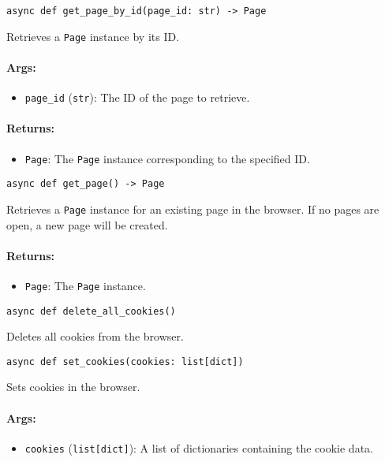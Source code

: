 \documentclass{article}
\begin{document}
\noindent\texttt{async def get\_page\_by\_id(page\_id: str) -> Page}

\noindent Retrieves a \texttt{Page} instance by its ID.

\paragraph{Args:}
\begin{itemize}
    \item \texttt{page\_id} (\texttt{str}): The ID of the page to retrieve.
\end{itemize}

\paragraph{Returns:}
\begin{itemize}
    \item \texttt{Page}: The \texttt{Page} instance corresponding to the specified ID.
\end{itemize}

\noindent\texttt{async def get\_page() -> Page}

\noindent Retrieves a \texttt{Page} instance for an existing page in the browser. If no pages are open, a new page will be created.

\paragraph{Returns:}
\begin{itemize}
    \item \texttt{Page}: The \texttt{Page} instance.
\end{itemize}

\noindent\texttt{async def delete\_all\_cookies()}

\noindent Deletes all cookies from the browser.

\noindent\texttt{async def set\_cookies(cookies: list[dict])}

\noindent Sets cookies in the browser.

\paragraph{Args:}
\begin{itemize}
    \item \texttt{cookies} (\texttt{list[dict]}): A list of dictionaries containing the cookie data.
\end{itemize}
\end{document}
